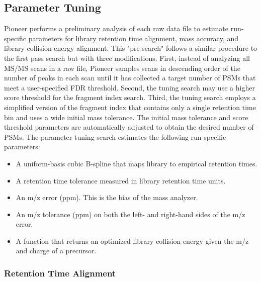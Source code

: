 \documentclass[pdflatex,sn-nature]{sn-jnl}
\begin{document}
\subsection{Parameter Tuning}\label{subsec:parameter-tuning}

Pioneer performs a preliminary analysis of each raw data file to estimate run-specific parameters for library retention time alignment, mass accuracy, and library collision energy alignment. This "pre-search" follows a similar procedure to the first pass search but with three modifications. First, instead of analyzing all MS/MS scans in a raw file, Pioneer samples scans in descending order of the number of peaks in each scan until it has collected a target number of PSMs that meet a user-specified FDR threshold. Second, the tuning search may use a higher score threshold for the fragment index search. Third, the tuning search employs a simplified version of the fragment index that contains only a single retention time bin and uses a wide initial mass tolerance. The initial mass tolerance and score threshold parameters are automatically adjusted to obtain the desired number of PSMs. The parameter tuning search estimates the following run-specific parameters: 

 \begin{itemize}
    \item A uniform-basis cubic B-spline that maps library to empirical retention times.
    \item A retention time tolerance measured in library retention time units. 
    \item An m/z error (ppm). This is the bias of the mass analyzer.
    \item An m/z tolerance (ppm) on both the left- and right-hand sides of the m/z error.
    \item A function that returns an optimized library collision energy given the m/z and charge of a precursor. 
\end{itemize}



\subsubsection{Retention Time Alignment}\label{sec:rt_align}
\end{document}
